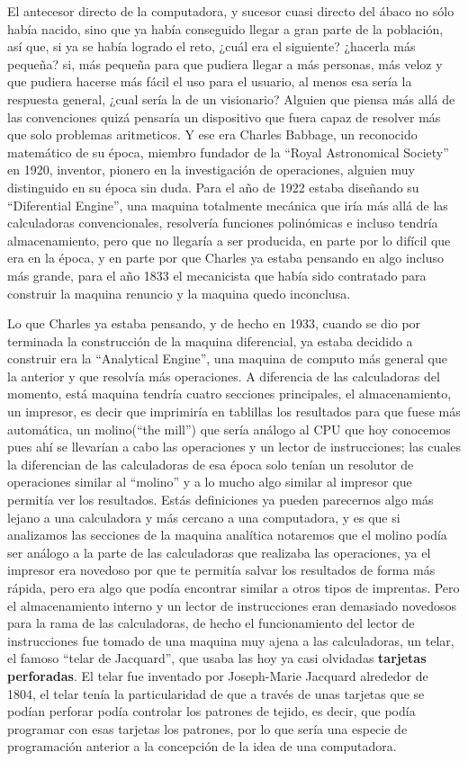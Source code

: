 \documentclass[letterpaper,12pt,oneside]{book}
\begin{document}
		El antecesor directo de la computadora, y sucesor cuasi directo del ábaco no sólo había nacido, sino que ya había conseguido llegar a gran parte de
		la población, así que, si ya se había logrado el reto, ¿cuál era el siguiente? ¿hacerla más pequeña? si, más pequeña para que pudiera llegar a más personas,
		más veloz y que pudiera hacerse más fácil el uso para el usuario, al menos esa sería la respuesta general, ¿cual sería la de un visionario? Alguien
		que piensa más allá de las convenciones quizá pensaría un dispositivo que fuera capaz de resolver más que solo problemas aritmeticos. Y ese era Charles Babbage,
		un reconocido matemático de su época, miembro fundador de la ``Royal Astronomical Society'' en 1920, inventor, pionero en la investigación
		de operaciones, alguien muy distinguido en su época sin duda. Para el año de 1922 estaba diseñando su ``Diferential Engine'', una maquina totalmente mecánica que iría más allá de las
		calculadoras convencionales, resolvería funciones polinómicas e incluso tendría almacenamiento, pero que no llegaría a ser producida, en parte
		por lo difícil que era en la época, y en parte por que Charles ya estaba pensando en algo incluso más grande, para el año 1833 el mecanicista
		que había sido contratado para construir la maquina renuncio y la maquina quedo inconclusa.
		
		Lo que Charles ya estaba pensando, y de hecho en 1933, cuando se dio por terminada la construcción de la maquina diferencial, ya estaba decidido a construir era la 
		``Analytical Engine'', una maquina de computo más general que la anterior y que resolvía más operaciones. A diferencia de las calculadoras del momento, está maquina 
		tendría cuatro secciones principales, 
		el almacenamiento, un impresor, es decir que imprimiría en
		tablillas los resultados para que fuese más automática, un molino(``the mill'') que sería análogo al CPU que hoy conocemos pues ahí
		se llevarían a cabo las operaciones y un lector de instrucciones; las cuales la diferencian de las calculadoras de esa época solo tenían un resolutor de
		operaciones similar al ``molino'' y a lo mucho algo similar al impresor que permitía ver los resultados. Estás definiciones ya pueden
		parecernos algo más lejano a una calculadora y más cercano a una computadora, y es que si analizamos las secciones de la maquina analítica notaremos que el molino podía ser análogo a la parte de las calculadoras
		que realizaba las operaciones, ya el impresor era novedoso por que te permitía salvar los resultados de forma más rápida, pero
		era algo que podía encontrar similar a otros tipos de imprentas. Pero el almacenamiento interno y un lector de instrucciones
		eran demasiado novedosos para la rama de las calculadoras, de hecho el funcionamiento del lector de instrucciones fue tomado de una maquina
		muy ajena a las calculadoras, un telar, el famoso ``telar de Jacquard'', que usaba las hoy ya casi olvidadas \textbf{tarjetas perforadas}. El telar
		fue inventado por Joseph-Marie Jacquard alrededor de 1804, el telar tenía la particularidad de que a través de unas tarjetas que se podían perforar podía
		controlar los patrones de tejido, es decir, que podía programar con esas tarjetas los patrones, por lo que sería una especie de programación anterior
		a la concepción de la idea de una computadora.
\end{document}
